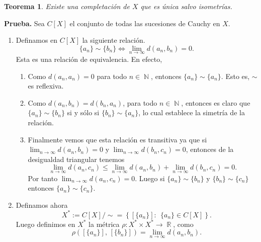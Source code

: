 \documentclass[x11names, 12pt]{book}
\newtheorem{teorema}{Teorema}
\DeclareMathOperator{\ene}{\mathbb{N}}
\DeclareMathOperator{\R}{\mathbb{R}}
\begin{document}
\begin{teorema}
Existe una completación de $X$ que es única salvo isometrías.
\end{teorema}
\textbf{Prueba.} Sea $C[X]$ el conjunto de todas las sucesiones de Cauchy en $X$.
\begin{enumerate}
    \item Definamos en $C[X]$ la siguiente relación.
\[\{a_n\} \sim \{b_n\} \iff \lim_{n\to\infty} d(a_n,b_n)=0. \]
Esta es una relación de equivalencia. En efecto,
\begin{enumerate}
    \item Como $d(a_n, a_n)=0$ para todo $n\in \ene$, entonces $\{a_n\} \sim \{a_n\}$. Esto es, $\sim$ es reflexiva.
    \item Como  $d(a_n, b_n)=d(b_n, a_n)$, para todo $n\in \ene$, entonces es claro que $\{a_n\} \sim \{b_n\}$ si y sólo si \linebreak $\{b_n\} \sim \{a_n\}$, lo cual establece la simetría de la relación.
     \item   Finalmente vemos que esta relación es transitiva ya que si $\lim_{n\to\infty} d(a_n,b_n)=0$ y  \linebreak $\lim_{n\to\infty} d(b_n,c_n)=0$, entonces de la desigualdad triangular tenemos
\[\lim_{n\to\infty} d(a_n,c_n) \leq \lim_{n\to\infty} d(a_n,b_n)+\lim_{n\to\infty} d(b_n,c_n) =0.\]
Por tanto $\lim_{n\to\infty} d(a_n,c_n)=0$. Luego si $\{a_n\} \sim \{b_n\}$ y $\{b_n\} \sim \{c_n\}$ entonces $\{a_n\} \sim \{c_n\}$.
\end{enumerate}


\item Definamos ahora
\[ X^*:=C[X]/ \sim =\left\{[\{a_n\}]: \ \ \{a_n\}\in C[X] \right\} .\]
Luego definimos en $X^*$ la métrica $\rho:X^* \times X^* \to \R$, como
\[\rho ([\{a_n\}],\, [\{b_n\}])=\lim_{n\to\infty} d(a_n,b_n).\]


\end{enumerate}
\end{document}
